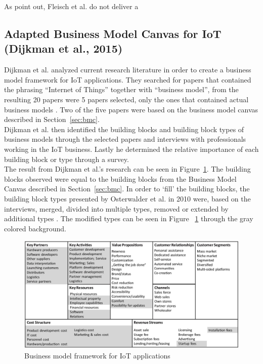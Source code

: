 		As point out, Fleisch et al. do not deliver a 


	\subsection{Adapted Business Model Canvas for IoT (Dijkman et al., 2015)}
		Dijkman et al. analyzed current research literature in order to create a business model framework for IoT applications. They searched for papers that contained the phrasing ``Internet of Things'' together with ``business model'', from the resulting 20 papers were 5 papers selected, only the ones that contained actual business models \cite{dijkman}. Two of the five papers were based on the business model canvas described in Section~\ref{sec:bmc}.\\
		Dijkman et al.  then identified the building blocks and building block types of business models through the selected papers and interviews with professionals working in the IoT business. Lastly he determined the relative importance of each building block or type through a survey.\\
		The result from Dijkman et al.'s research can be seen in Figure~\ref{fig:bm_dijkman}. The building blocks observed were equal to the building blocks from the Business Model Canvas described in Section~\ref{sec:bmc}. In order to `fill' the building blocks, the building block types presented by Osterwalder et al. in 2010 were, based on the interviews, merged, divided into multiple types, removed or extended by additional types \cite{osterwalder2010} \cite{dijkman}. The modified types can be seen in Figure ~\ref{fig:bm_dijkman} through the gray colored background.  

		\begin{figure}[ht]
			\begin{center}
		    \includegraphics[scale=0.52]{Talk11/iot_canvas_dijkman.jpg}
		    \end{center}
		    \caption{Business model framework for IoT applications}
		    \label{fig:bm_dijkman}
		\end{figure}

